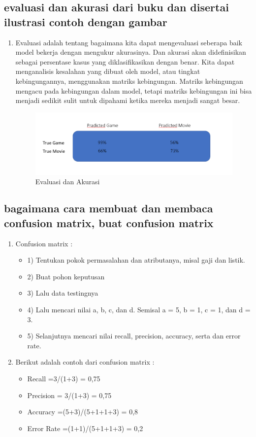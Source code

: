\subsection{evaluasi dan akurasi dari buku dan disertai ilustrasi contoh dengan gambar}
\begin{enumerate}
\item Evaluasi adalah tentang  bagaimana kita dapat mengevaluasi seberapa baik model bekerja dengan mengukur akurasinya. Dan akurasi akan didefinisikan sebagai persentase kasus yang diklasifikasikan dengan benar. Kita dapat menganalisis kesalahan yang dibuat oleh model, atau tingkat kebingungannya, menggunakan matriks kebingungan. Matriks kebingungan mengacu pada kebingungan dalam model, tetapi matriks kebingungan ini bisa menjadi sedikit sulit untuk dipahami ketika mereka menjadi sangat besar.
\begin{figure}[ht]
\centering
\includegraphics[scale=1]{figures/andi/no3.PNG}
\caption{ Evaluasi dan Akurasi}
\label{contoh}
\end{figure}
\end{enumerate}

\subsection{ bagaimana cara membuat dan membaca confusion matrix, buat confusion matrix }
\begin{enumerate}
\item  Confusion matrix :
\begin{itemize}
\item 1)	Tentukan pokok permasalahan dan atributanya, misal gaji dan listik.
\item 2)	Buat pohon keputusan
\item 3)	Lalu data testingnya
\item 4)	Lalu mencari nilai a, b, c, dan d. Semisal a = 5, b = 1, c = 1, dan d = 3.
\item 5)	Selanjutnya mencari nilai recall, precision, accuracy, serta dan error rate.
\end{itemize}
\item Berikut adalah contoh dari confusion matrix :
\begin{itemize}
\item Recall =3/(1+3) = 0,75
\item Precision = 3/(1+3) = 0,75
\item Accuracy =(5+3)/(5+1+1+3) = 0,8
\item Error Rate =(1+1)/(5+1+1+3) = 0,2
\end{itemize}
\end{enumerate}

